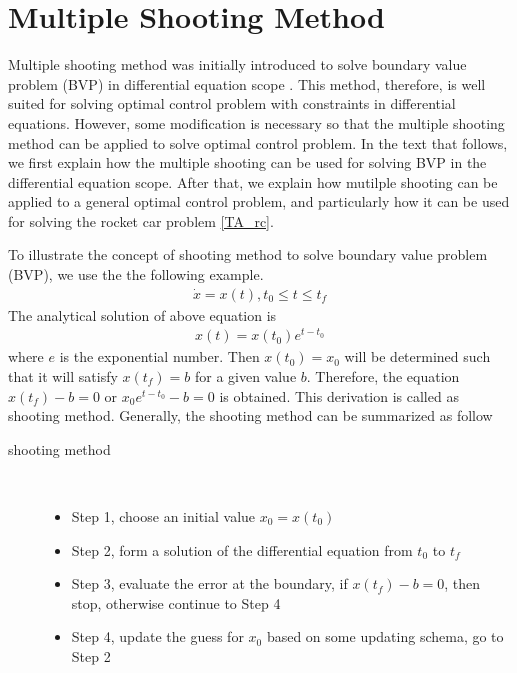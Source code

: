 \documentclass  [
  paper    = a4,
  BCOR     = 10mm,
  twoside,
  fontsize = 12pt,
  fleqn,
  toc      = bibnumbered,
  toc      = listofnumbered,
  numbers  = noendperiod,
  headings = normal,
  listof   = leveldown,
  version  = 3.03
]                                       {scrreprt}
\newcommand{\<}{\langle}
\renewcommand{\>}{\rangle}
\begin{document}
   \section{Multiple Shooting Method}
   Multiple shooting method was initially introduced to solve boundary value problem (BVP) in differential equation scope \cite{DJJ62}. This method, therefore, is well suited for solving optimal control problem with constraints in differential equations. However, some modification is necessary so that the multiple shooting method can be applied to solve optimal control problem. In the text that follows, we first explain how the multiple shooting can be used for solving BVP in the differential equation scope. After that, we explain how mutilple shooting can be applied to a general optimal control problem, and particularly how it can be used for solving the rocket car problem \ref{TA_rc}.
   
   To illustrate the concept of shooting method to solve boundary value problem (BVP), we use the the following example.
   \begin{align*}
   \dot{x} = x(t), t_0 \leq t \leq t_f	
   \end{align*}
   The analytical solution of above equation is 
   \begin{align*}
   x(t) = x(t_0)e^{t - t_0}
   \end{align*}
   where $e$ is the exponential number. Then $x(t_0) = x_0$ will be determined such that it will satisfy $x(t_f)=b$ for a given value $b$. Therefore, the equation $x(t_f)-b = 0$ or $x_0e^{t - t_0}-b =0$ is obtained. This derivation is called as shooting method. Generally, the shooting method can be summarized as follow
   \begin{description}
   	\item[shooting method] \
   	\begin{itemize}
   		\item Step 1, choose an initial value $x_0 = x(t_0)$ 
   		\item Step 2, form a solution of the differential equation from $t_0$ to $t_f$
   		\item Step 3, evaluate the error at the boundary, if $x(t_f) - b = 0$, then stop, otherwise continue to Step 4 
   		\item Step 4, update the guess for $x_0$ based on some updating schema, go to Step 2
   	\end{itemize}
   \end{description}
   
\end{document}
